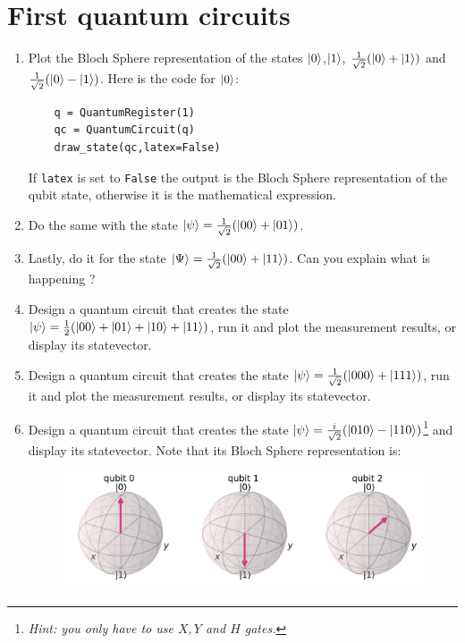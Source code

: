 \documentclass{article}
\begin{document}
\newpage

\section{First quantum circuits}

\begin{enumerate}
    \item Plot the Bloch Sphere representation of the states $\ket{0}$,$\ket{1}$, $\frac{1}{\sqrt{2}}(\ket{0}+\ket{1})$ and $\frac{1}{\sqrt{2}}(\ket{0}-\ket{1})$. Here is the code for $\ket{0}$:
    \begin{verbatim}
    q = QuantumRegister(1)
    qc = QuantumCircuit(q)
    draw_state(qc,latex=False)
    \end{verbatim}
    If \verb|latex| is set to \verb|False| the output is the Bloch Sphere representation of the qubit state, otherwise it is the mathematical expression.
    \item Do the same with the state $\ket{\psi}=\frac{1}{\sqrt{2}}(\ket{00}+\ket{01})$. 
    \item Lastly, do it for the state $\ket{\Psi}=\frac{1}{\sqrt{2}}(\ket{00}+\ket{11})$. Can you explain what is happening ?
    \item Design a quantum circuit that creates the state $\ket{\psi}=\frac{1}{2}(\ket{00}+\ket{01}+\ket{10}+\ket{11})$, run it and plot the measurement results, or display its statevector.
    \item Design a quantum circuit that creates the state $\ket{\psi}=\frac{1}{\sqrt{2}}(\ket{000}+\ket{111})$, run it and plot the measurement results, or display its statevector.
     \item Design a quantum circuit that creates the state $\ket{\psi}=\frac{i}{\sqrt{2}}(\ket{010}-\ket{110})$\footnote{\textit{Hint: you only have to use $X,Y$ and $H$ gates.}} and display its statevector. Note that its Bloch Sphere representation is:
     \begin{figure}[H]
         \centering
         \includegraphics[scale=0.35]{bloch3.png}
     \end{figure}

\end{enumerate}
\end{document}

